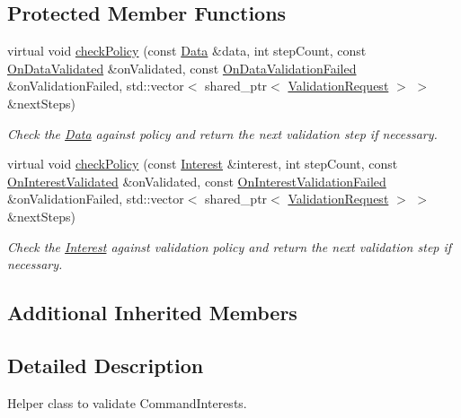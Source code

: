 \subsection*{Protected Member Functions}
\begin{DoxyCompactItemize}
\item 
virtual void \hyperlink{classndn_1_1CommandInterestValidator_aa28092900d40935471f16ae978bc74c2}{check\+Policy} (const \hyperlink{classndn_1_1Data}{Data} \&data, int step\+Count, const \hyperlink{namespacendn_aeaa15e849fd25636f59ca61acb64e532}{On\+Data\+Validated} \&on\+Validated, const \hyperlink{namespacendn_ae3c60219d74ba747e368708d93782760}{On\+Data\+Validation\+Failed} \&on\+Validation\+Failed, std\+::vector$<$ shared\+\_\+ptr$<$ \hyperlink{classndn_1_1ValidationRequest}{Validation\+Request} $>$ $>$ \&next\+Steps)
\begin{DoxyCompactList}\small\item\em Check the \hyperlink{classndn_1_1Data}{Data} against policy and return the next validation step if necessary. \end{DoxyCompactList}\item 
virtual void \hyperlink{classndn_1_1CommandInterestValidator_a85bf8d1c56ad281b5d704cac73a8866e}{check\+Policy} (const \hyperlink{classndn_1_1Interest}{Interest} \&interest, int step\+Count, const \hyperlink{namespacendn_a90fe4b4d97a7870d87f2fce8fdc88f95}{On\+Interest\+Validated} \&on\+Validated, const \hyperlink{namespacendn_a6cb4f04de7c1e8da06d8f5865b3d2877}{On\+Interest\+Validation\+Failed} \&on\+Validation\+Failed, std\+::vector$<$ shared\+\_\+ptr$<$ \hyperlink{classndn_1_1ValidationRequest}{Validation\+Request} $>$ $>$ \&next\+Steps)
\begin{DoxyCompactList}\small\item\em Check the \hyperlink{classndn_1_1Interest}{Interest} against validation policy and return the next validation step if necessary. \end{DoxyCompactList}\end{DoxyCompactItemize}
\subsection*{Additional Inherited Members}


\subsection{Detailed Description}
Helper class to validate Command\+Interests. 

